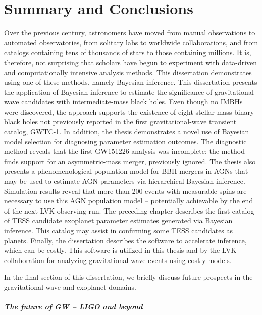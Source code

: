 \chapter{Summary and Conclusions}
\label{cp.conc}

Over the previous century, astronomers have moved from manual observations to automated observatories, from solitary labs to worldwide collaborations, and from catalogs containing tens of thousands of stars to those containing millions. 
It is, therefore, not surprising that scholars have begun to experiment with data-driven and computationally intensive analysis methods. This dissertation demonstrates using one of these methods, namely Bayesian inference. 
This dissertation presents the application of Bayesian inference to estimate the significance of gravitational-wave candidates with intermediate-mass black holes. 
Even though no IMBHs were discovered, the approach supports the existence of eight stellar-mass binary black holes not previously reported in the first gravitational-wave transient catalog, GWTC-1. 
In addition, the thesis demonstrates a novel use of Bayesian model selection for diagnosing parameter estimation outcomes. 
The diagnostic method reveals that the first GW151226 analysis was incomplete: the method finds support for an asymmetric-mass merger, previously ignored. 
The thesis also presents a phenomenological population model for BBH mergers in AGNs that may be used to estimate AGN parameters via hierarchical Bayesian inference. 
Simulation results reveal that more than 200 events with measurable spins are necessary to use this AGN population model -- potentially achievable by the end of the next LVK observing run. 
The preceding chapter describes the first catalog of TESS candidate exoplanet parameter estimates generated via Bayesian inference. 
This catalog may assist in confirming some TESS candidates as planets. 
Finally, the dissertation describes the software to accelerate inference, which can be costly. 
This software is utilized in this thesis and by the LVK collaboration for analyzing gravitational wave events using costly models.

In the final section of this dissertation, we briefly discuss future prospects in the gravitational wave and exoplanet domains. 

\paragraph{The future of GW -- LIGO and beyond}

